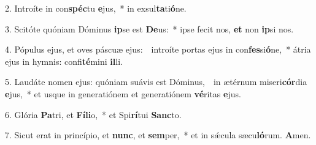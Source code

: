 
2. Introíte in con\textbf{spéc}tu \textbf{e}jus,~* in exsul\textbf{ta}ti\textbf{ó}ne.

3. Scitóte quóniam Dóminus \textbf{ip}se est \textbf{De}us:~* ipse fecit nos, \textbf{et} non \textbf{ip}si nos.

4. Pópulus ejus, et oves páscuæ ejus:~\GreDagger\ introíte portas ejus in con\textbf{fes}si\textbf{ó}ne,~* átria ejus in hymnis: confi\textbf{té}mini \textbf{il}li.

5. Laudáte nomen ejus: quóniam suávis est Dóminus,~\GreDagger\ in ætérnum miseri\textbf{cór}dia \textbf{e}jus,~* et usque in generatiónem et generatiónem \textbf{vé}ritas \textbf{e}jus.

6. Glória \textbf{Pa}tri, et \textbf{Fí}\textbf{li}o,~* et Spi\textbf{rí}tui \textbf{Sanc}to.

7. Sicut erat in princípio, et \textbf{nunc}, et \textbf{sem}per,~* et in s\'{\ae}cula sæcu\textbf{ló}rum. \textbf{A}men.